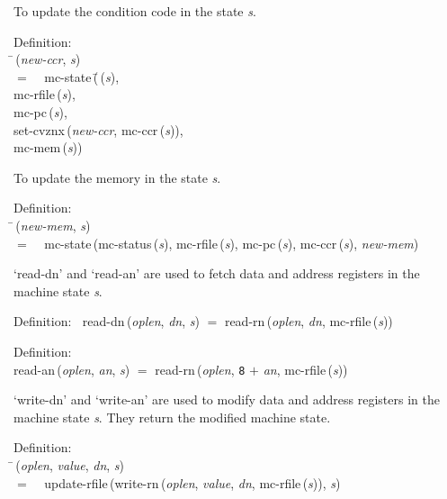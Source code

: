  To update the condition code in the state {\it{s\/}}.
\begin{tabbing}{\sc Definition}: \\  
\=\,({\it{new-ccr\/}}, {\it{s\/}}) \\ 
$=$$\;\;\;\;${\rm{mc-state}}\,(\=\,({\it{s\/}}), \\ 
{\rm{mc-rfile}}\,({\it{s\/}}), \\ 
{\rm{mc-pc}}\,({\it{s\/}}), \\ 
{\rm{set-cvznx}}\,({\it{new-ccr\/}}, {\rm{mc-ccr}}\,({\it{s\/}})), \\ 
{\rm{mc-mem}}\,({\it{s\/}}))\-\-
\end{tabbing}

 To update the memory in the state {\it{s\/}}.
\begin{tabbing}{\sc Definition}: \\  
\=\,({\it{new-mem\/}}, {\it{s\/}}) \\ 
$=$$\;\;\;\;${\rm{mc-state}}\,({\rm{mc-status}}\,({\it{s\/}}), {\rm{mc-rfile}}\,({\it{s\/}}), {\rm{mc-pc}}\,({\it{s\/}}), {\rm{mc-ccr}}\,({\it{s\/}}), {\it{new-mem\/}})\-
\end{tabbing}

 `read-dn' and `read-an' are used to fetch data and address registers in the machine state {\it{s\/}}.
\begin{tabbing}{\sc Definition}:$\;\;$
{\rm{read-dn}}\,({\it{oplen\/}}, {\it{dn\/}}, {\it{s\/}}) $=$ {\rm{read-rn}}\,({\it{oplen\/}}, {\it{dn\/}}, {\rm{mc-rfile}}\,({\it{s\/}}))
\end{tabbing}

\begin{tabbing}{\sc Definition}: \\  
{\rm{read-an}}\,({\it{oplen\/}}, {\it{an\/}}, {\it{s\/}}) $=$ {\rm{read-rn}}\,({\it{oplen\/}}, {\tt{8}} $+$ {\it{an\/}}, {\rm{mc-rfile}}\,({\it{s\/}}))
\end{tabbing}

 `write-dn' and `write-an' are used to modify data and address registers in the machine state {\it{s\/}}.
 They return the modified machine state.
\begin{tabbing}{\sc Definition}: \\  
\=\,({\it{oplen\/}}, {\it{value\/}}, {\it{dn\/}}, {\it{s\/}}) \\ 
$=$$\;\;\;\;${\rm{update-rfile}}\,({\rm{write-rn}}\,({\it{oplen\/}}, {\it{value\/}}, {\it{dn\/}}, {\rm{mc-rfile}}\,({\it{s\/}})), {\it{s\/}})\-
\end{tabbing}

